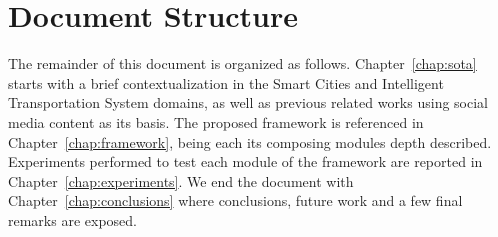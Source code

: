 


\section{Document Structure}\label{sec:doc_structure}
The remainder of this document is organized as follows.
Chapter~\ref{chap:sota} starts with a brief contextualization in the Smart Cities and Intelligent Transportation System domains, as well as previous related works using social media content as its basis.
The proposed framework is referenced in Chapter~\ref{chap:framework}, being each its composing modules depth described.
Experiments performed to test each module of the framework are reported in Chapter~\ref{chap:experiments}.
We end the document with Chapter~\ref{chap:conclusions} where conclusions, future work and a few final remarks are exposed.